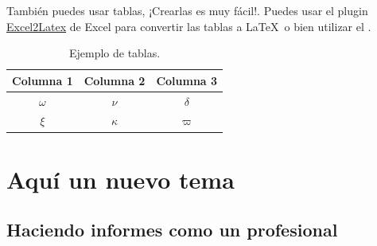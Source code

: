 	También puedes usar tablas, ¡Crearlas es muy fácil!. Puedes usar el plugin \href{https://www.ctan.org/tex-archive/support/excel2latex}{Excel2Latex} \cite{excel2latex} de Excel para convertir las tablas a \LaTeX\ o bien utilizar el  \cite{tablesgenerator}.

	\begin{table}[H]
		\centering
		\caption{Ejemplo de tablas.}
		\begin{tabular}{ccc}
			\hline
			\textbf{Columna 1} & \textbf{Columna 2} & \textbf{Columna 3} \bigstrut\\
			\hline
			$\omega$ & $\nu$ & $\delta$ \bigstrut[t]\\
			$\xi$ & $\kappa$ & $\varpi$ \bigstrut[b] \\
			\hline
		\end{tabular}
		\label{tab:tabla-1}
	\end{table}


\clearpage
\section{Aquí un nuevo tema}

\subsection{Haciendo informes como un profesional}


	~ \lipsum[1] \\

	\lipsum[115]


